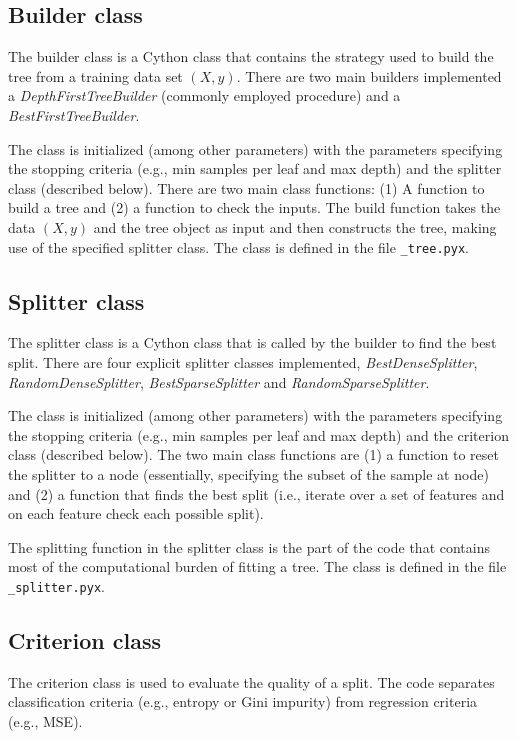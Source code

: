 \documentclass[11pt, a4paper]{article}
\begin{document}
\subsection{Builder class}

The builder class is a Cython class that contains the strategy used to
build the tree from a training data set $(X, y)$. There are two main
builders implemented a \textit{DepthFirstTreeBuilder} (commonly
employed procedure) and a \textit{BestFirstTreeBuilder}.

The class is initialized (among other parameters) with the parameters
specifying the stopping criteria (e.g., min samples per leaf and max
depth) and the splitter class (described below). There are two main
class functions: (1) A function to build a tree and (2) a function to
check the inputs.  The build function takes the data $(X, y)$ and the
tree object as input and then constructs the tree, making use of the
specified splitter class. The class is defined in the file
\texttt{\_tree.pyx}.

\subsection{Splitter class}
The splitter class is a Cython class that is called by the builder to find
the best split. There are four explicit splitter classes implemented,
\textit{BestDenseSplitter}, \textit{RandomDenseSplitter},
\textit{BestSparseSplitter} and \textit{RandomSparseSplitter}.

The class is initialized (among other parameters) with the parameters
specifying the stopping criteria (e.g., min samples per leaf and max
depth) and the criterion class (described below). The two main class
functions are (1) a function to reset the splitter to a node
(essentially, specifying the subset of the sample at node) and (2) a
function that finds the best split (i.e., iterate over a set of
features and on each feature check each possible split).

The splitting function in the splitter class is the part of the code
that contains most of the computational burden of fitting a tree. The
class is defined in the file \texttt{\_splitter.pyx}.

\subsection{Criterion class}
The criterion class is used to evaluate the quality of a split. The
code separates classification criteria (e.g., entropy or Gini
impurity) from regression criteria (e.g., MSE).
\end{document}
